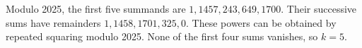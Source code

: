 Modulo 2025, the first five summands are $1,1457,243,649,1700$. Their successive sums have remainders $1,1458,1701,325,0$. These powers can be obtained by repeated squaring modulo 2025. None of the first four sums vanishes, so $\boxed{k=5}$.
